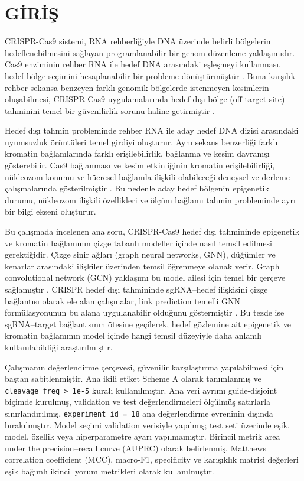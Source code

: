 \chapter{GİRİŞ}
\label{chap:giris}

CRISPR-Cas9 sistemi, RNA rehberliğiyle DNA üzerinde belirli bölgelerin hedeflenebilmesini sağlayan programlanabilir bir genom düzenleme yaklaşımıdır. Cas9 enziminin rehber RNA ile hedef DNA arasındaki eşleşmeyi kullanması, hedef bölge seçimini hesaplanabilir bir probleme dönüştürmüştür . Buna karşılık rehber sekansa benzeyen farklı genomik bölgelerde istenmeyen kesimlerin oluşabilmesi, CRISPR-Cas9 uygulamalarında hedef dışı bölge (off-target site) tahminini temel bir güvenilirlik sorunu haline getirmiştir .

Hedef dışı tahmin probleminde rehber RNA ile aday hedef DNA dizisi arasındaki uyumsuzluk örüntüleri temel girdiyi oluşturur. Aynı sekans benzerliği farklı kromatin bağlamlarında farklı erişilebilirlik, bağlanma ve kesim davranışı gösterebilir. Cas9 bağlanması ve kesim etkinliğinin kromatin erişilebilirliği, nükleozom konumu ve hücresel bağlamla ilişkili olabileceği deneysel ve derleme çalışmalarında gösterilmiştir . Bu nedenle aday hedef bölgenin epigenetik durumu, nükleozom ilişkili özellikleri ve ölçüm bağlamı tahmin probleminde ayrı bir bilgi ekseni oluşturur.

Bu çalışmada incelenen ana soru, CRISPR-Cas9 hedef dışı tahmininde epigenetik ve kromatin bağlamının çizge tabanlı modeller içinde nasıl temsil edilmesi gerektiğidir. Çizge sinir ağları (graph neural networks, GNN), düğümler ve kenarlar arasındaki ilişkiler üzerinden temsil öğrenmeye olanak verir. Graph convolutional network (GCN) yaklaşımı bu model ailesi için temel bir çerçeve sağlamıştır . CRISPR hedef dışı tahmininde sgRNA--hedef ilişkisini çizge bağlantısı olarak ele alan çalışmalar, link prediction temelli GNN formülasyonunun bu alana uygulanabilir olduğunu göstermiştir . Bu tezde ise sgRNA--target bağlantısının ötesine geçilerek, hedef gözlemine ait epigenetik ve kromatin bağlamının model içinde hangi temsil düzeyiyle daha anlamlı kullanılabildiği araştırılmıştır.

Çalışmanın değerlendirme çerçevesi, güvenilir karşılaştırma yapılabilmesi için baştan sabitlenmiştir. Ana ikili etiket Scheme A olarak tanımlanmış ve \texttt{cleavage\_freq > 1e-5} kuralı kullanılmıştır. Ana veri ayrımı guide-disjoint biçimde kurulmuş, validation ve test değerlendirmeleri ölçülmüş satırlarla sınırlandırılmış, \texttt{experiment\_id = 18} ana değerlendirme evreninin dışında bırakılmıştır. Model seçimi validation verisiyle yapılmış; test seti üzerinde eşik, model, özellik veya hiperparametre ayarı yapılmamıştır. Birincil metrik area under the precision--recall curve (AUPRC) olarak belirlenmiş, Matthews correlation coefficient (MCC), macro-F1, specificity ve karışıklık matrisi değerleri eşik bağımlı ikincil yorum metrikleri olarak kullanılmıştır.

